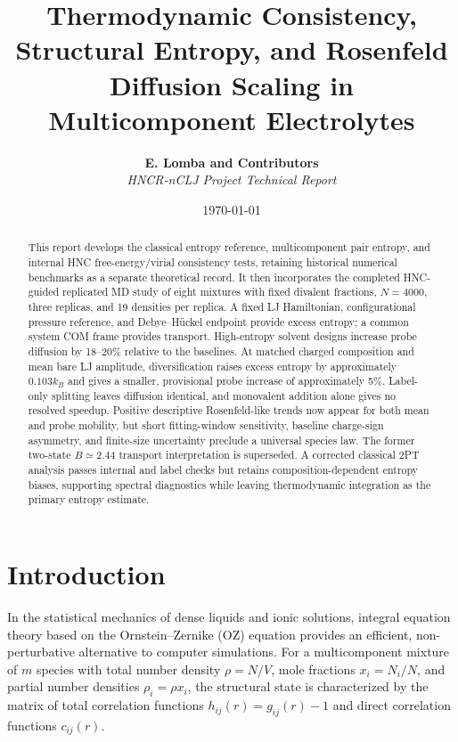 \documentclass[11pt,a4paper]{article}
\title{\textbf{Thermodynamic Consistency, Structural Entropy, and Rosenfeld Diffusion Scaling in Multicomponent Electrolytes}}
\author{\textbf{E. Lomba and Contributors}\\[0.5em] \textit{HNCR-nCLJ Project Technical Report}}
\date{\today}
\begin{document}
\maketitle

\begin{abstract}
This report develops the classical entropy reference, multicomponent pair entropy, and internal HNC free-energy/virial consistency tests, retaining historical numerical benchmarks as a separate theoretical record. It then incorporates the completed HNC-guided replicated MD study of eight mixtures with fixed divalent fractions, $N=4000$, three replicas, and 19 densities per replica. A fixed LJ Hamiltonian, configurational pressure reference, and Debye--H\"uckel endpoint provide excess entropy; a common system COM frame provides transport. High-entropy solvent designs increase probe diffusion by 18--20\% relative to the baselines. At matched charged composition and mean bare LJ amplitude, diversification raises excess entropy by approximately $0.103k_B$ and gives a smaller, provisional probe increase of approximately 5\%. Label-only splitting leaves diffusion identical, and monovalent addition alone gives no resolved speedup. Positive descriptive Rosenfeld-like trends now appear for both mean and probe mobility, but short fitting-window sensitivity, baseline charge-sign asymmetry, and finite-size uncertainty preclude a universal species law. The former two-state $B\simeq2.44$ transport interpretation is superseded.
A corrected classical 2PT analysis passes internal and label checks but retains composition-dependent entropy biases, supporting spectral diagnostics while leaving thermodynamic integration as the primary entropy estimate.
\end{abstract}

\tableofcontents
\newpage

\section{Introduction}

In the statistical mechanics of dense liquids and ionic solutions, integral equation theory based on the Ornstein--Zernike (OZ) equation provides an efficient, non-perturbative alternative to computer simulations. For a multicomponent mixture of $m$ species with total number density $\rho = N/V$, mole fractions $x_i = N_i / N$, and partial number densities $\rho_i = \rho x_i$, the structural state is characterized by the matrix of total correlation functions $h_{ij}(r) = g_{ij}(r) - 1$ and direct correlation functions $c_{ij}(r)$.
\end{document}
